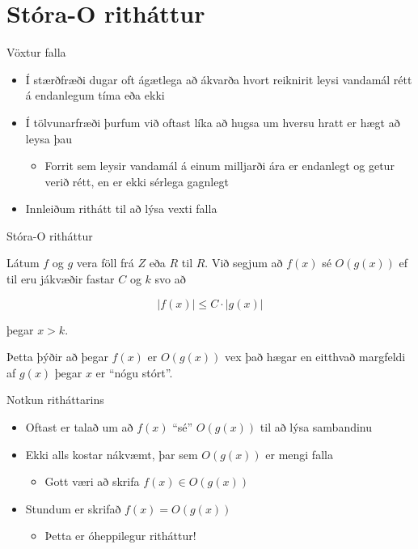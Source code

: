 \documentclass[handout]{beamer}
\begin{document}
\section{Stóra-O ritháttur}

\begin{frame}{Vöxtur falla}
\pause
\begin{itemize}
 \item Í stærðfræði dugar oft ágætlega að ákvarða hvort reiknirit leysi vandamál rétt á endanlegum tíma eða ekki
 \item Í tölvunarfræði þurfum við oftast líka að hugsa um hversu hratt er hægt að leysa þau
 \begin{itemize}
  \item Forrit sem leysir vandamál á einum milljarði ára er endanlegt og getur verið rétt, en er ekki sérlega gagnlegt
 \end{itemize}
 \item Innleiðum rithátt til að lýsa vexti falla
\end{itemize}
\end{frame}

\begin{frame}{Stóra-O ritháttur}
\begin{tcolorbox}[title=Stóra O ritháttur]
Látum $f$ og $g$ vera föll frá $Z$ eða $R$ til $R$. Við segjum að $f(x)$ sé $O(g(x))$ ef til eru jákvæðir fastar $C$ og $k$ svo að

\[
 |f(x)| \leq C \cdot |g(x)|
\]

þegar $x > k$.
\end{tcolorbox}
Þetta þýðir að þegar $f(x)$ er $O(g(x))$ vex það hægar en eitthvað margfeldi af $g(x)$ þegar $x$ er ``nógu stórt''.
\end{frame}

\begin{frame}{Notkun ritháttarins}
\begin{itemize}
 \item Oftast er talað um að $f(x)$ ``sé'' $O(g(x))$ til að lýsa sambandinu
 \item Ekki alls kostar nákvæmt, þar sem $O(g(x))$ er mengi falla
 \begin{itemize}
  \item Gott væri að skrifa $f(x) \in O(g(x))$
 \end{itemize}
 \item Stundum er skrifað $f(x) = O(g(x))$
 \begin{itemize}
  \item Þetta er óheppilegur ritháttur!
 \end{itemize}
\end{itemize}
\end{frame}
\end{document}
